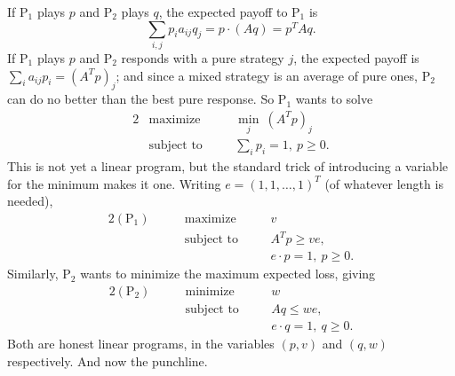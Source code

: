 If $\mathrm{P}_1$ plays $p$ and $\mathrm{P}_2$ plays $q$, the expected payoff to $\mathrm{P}_1$ is
$$
\sum_{i,j}p_i a_{ij}q_j = p\cdot(Aq) = p^TAq.
$$
If $\mathrm{P}_1$ plays $p$ and $\mathrm{P}_2$ responds with a pure strategy $j$, the expected payoff is $\sum_i a_{ij}p_i = (A^Tp)_j$; and since a mixed strategy is an average of pure ones, $\mathrm{P}_2$ can do no better than the best pure response. So $\mathrm{P}_1$ wants to solve
\begin{alignat*}{2}
    & \text{maximize} \quad && \min_{j}\ (A^Tp)_j\\
    & \text{subject to} \quad && \textstyle\sum_i p_i = 1,\ p \geq 0.
\end{alignat*}
This is not yet a linear program, but the standard trick of introducing a variable for the minimum makes it one. Writing $e = (1,1,\dots,1)^T$ (of whatever length is needed),
\begin{alignat*}{2}
    (\mathrm{P}_1) \qquad & \text{maximize} \quad && v \\
    & \text{subject to} \quad && A^Tp \geq ve,\\
    & && e\cdot p = 1,\ p \geq 0.
\end{alignat*}
Similarly, $\mathrm{P}_2$ wants to minimize the maximum expected loss, giving
\begin{alignat*}{2}
    (\mathrm{P}_2) \qquad & \text{minimize} \quad && w \\
    & \text{subject to} \quad && Aq \leq we,\\
    & && e\cdot q = 1,\ q \geq 0.
\end{alignat*}
Both are honest linear programs, in the variables $(p, v)$ and $(q, w)$ respectively. And now the punchline.


